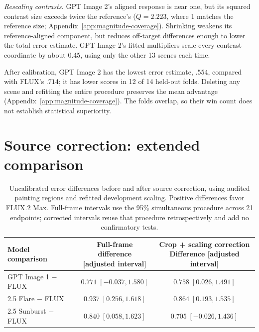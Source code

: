 \emph{Rescaling contrasts.} GPT Image 2's aligned response is near one, but its
squared contrast size exceeds twice the reference's ($Q=2.223$, where 1 matches the reference size;
Appendix~\ref{app:magnitude-coverage}).
Shrinking weakens its reference-aligned component, but reduces off-target
differences enough to lower the total error estimate. GPT Image 2's fitted multipliers
scale every contrast coordinate by about 0.45, using only the other 13 scenes each time.

After calibration, GPT Image 2 has the lowest error estimate, $.554$,
compared with FLUX's $.714$; it has lower scores in 12 of 14 held-out folds.
Deleting any scene and refitting the entire procedure preserves the mean
advantage (Appendix~\ref{app:magnitude-coverage}).
The folds overlap, so their win count does not establish statistical superiority.


\section{Source correction: extended comparison}\label{app:extended-source}
\begin{table}[!htbp]
\caption{Uncalibrated error differences before and after source correction, using audited painting regions and refitted development scaling. Positive differences favor FLUX.2 Max. Full-frame intervals use the 95\% simultaneous procedure across 21 endpoints; corrected intervals reuse that procedure retrospectively and add no confirmatory tests.}
\label{tab:source-comparison}
\centering\small
\begin{tabularx}{\linewidth}{@{}Xcc@{}}\toprule
Model comparison & \shortstack{Full-frame difference\\{[adjusted interval]}} & \shortstack{Crop + scaling correction\\Difference [adjusted interval]}\\\midrule
GPT Image 1 $-$ FLUX & $0.771\;[-0.037,1.580]$ & $0.758\;[0.026,1.491]$\\[2pt]
2.5 Flare $-$ FLUX & $0.937\;[0.256,1.618]$ & $0.864\;[0.193,1.535]$\\[2pt]
2.5 Sunburst $-$ FLUX & $0.840\;[0.058,1.623]$ & $0.705\;[-0.026,1.436]$\\[2pt]
\bottomrule\end{tabularx}

\end{table}
